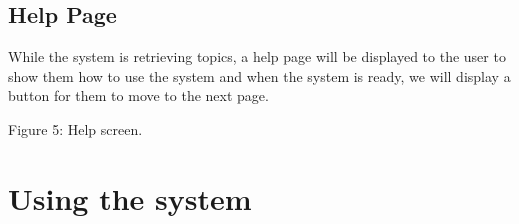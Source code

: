 \documentclass[hidelinks,english]{article}
\begin{document}
    \subsection{Help Page}
        While the system is retrieving topics, a help page will be displayed to the user to show them how to use the system and when the system is ready, we will display a button for them to move to the next page.
        \begin{center}
          Figure 5: Help screen.
          \label{Help}
        \end{center}
        
    \section{Using the system}
\end{document}
